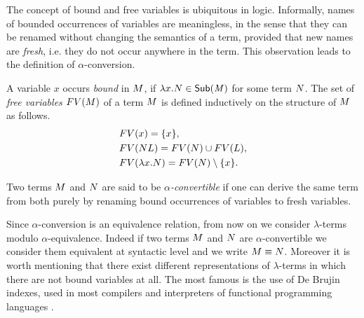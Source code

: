 \begin{THESIS}
	The concept of bound and free variables is ubiquitous in logic. Informally, names of bounded occurrences of variables are meaningless, in the sense that they can be renamed without changing the semantics of a term, provided that new names are \emph{fresh}, i.e. they do not occur anywhere in the term. This observation leads to the definition of $\alpha$-conversion.
	\begin{definition}
		A variable $x$ occurs \emph{bound} in $M$, if $\lambda x.N\in\mathsf{Sub(\mathit{M})}$ for some term $N$. The set of \emph{free variables} $FV(M)$ of a term $M$ is defined inductively on the structure of $M$ as follows.
		\begin{align*}
		&FV(x)=\{x\},\\
		&FV(NL)=FV(N)\cup FV(L),\\
		&FV(\lambda x.N)=FV(N)\setminus\{x\}.
		\end{align*}
	\end{definition}
	\begin{definition}
		Two terms $M$ and $N$ are said to be \emph{$\alpha$-convertible} if one can derive the same term from both purely by renaming bound occurrences of variables to fresh variables.
	\end{definition}
	Since $\alpha$-conversion is an equivalence relation, from now on we consider $\lambda$-terms modulo $\alpha$-equivalence. Indeed if two terms $M$ and $N$ are $\alpha$-convertible we consider them equivalent at syntactic level and we write $M\equiv N$. Moreover it is worth mentioning that there exist different representations of $\lambda$-terms in which there are not bound variables at all. The most famous is the use of De Brujin indexes, used in most compilers and interpreters of functional programming languages \cite{de_bruijn_lambda_1972}.
	
\end{THESIS}
